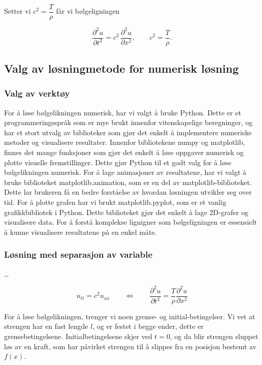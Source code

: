 Setter vi \(c^2=\dfrac{T}{\rho}\) får vi bølgeligningen

\begin{equation}
  \frac{\partial^2 u}{\partial t^2}
  = c^2\,\frac{\partial^2 u}{\partial x^2},
  \qquad
  c^2=\frac{T}{\rho}.
  \label{eq:utledetBolgelikning}
\end{equation}

\subsection{Valg av løsningmetode for numerisk løsning}
\subsubsection{Valg av verktøy}
For å løse bølgelikningen numerisk, har vi valgt å bruke Python. Dette er et programmeringsspråk som er mye brukt innenfor vitenskapelige
beregninger, og har et stort utvalg av biblioteker som gjør det enkelt å implementere numeriske metoder og visualisere resultater. Innenfor 
bibliotekene numpy og matplotlib, finnes det mange funksjoner som gjør det enkelt å løse oppgaver numerisk og plotte visuelle fremstillinger.
Dette gjør Python til et godt valg for å løse bølgelikningen numerisk. For å lage animasjoner av resultatene, har vi valgt å bruke biblioteket 
matplotlib.animation, som er en del av matplotlib-biblioteket. Dette lar brukeren få en bedre forståelse av hvordan løsningen utvikler seg over tid.
For å plotte grafen har vi brukt matplotlib.pyplot, som er et vanlig grafikkbibliotek i Python. Dette biblioteket gjør det enkelt å lage 2D-grafer og 
visualisere data. For å forstå komplekse lignigner som bølgeligningen er essensielt å kunne visualisere resultatene på en enkel måte.

\subsubsection{Løsning med separasjon av variable}
\dots

\begin{equation}
	u_{tt} = c^2 u_{xx} \qquad \iff \qquad 
	\frac{\partial^2 u}{\partial t^2} = \frac{T}{\rho} \frac{\partial^2 u}{\partial x^2}	
	\label{eq:bølgelikningForLøsning}
\end{equation}

For å løse bølgelikningen, trenger vi noen grense- og initial-betingelser. Vi vet at strengen har en fast lengde $l$,
og er festet i begge ender, dette er grensebetingelsene. Initialbetingelsene skjer ved $t=0$, og da blir strengen
sluppet løs av en kraft, som har påvirket strengen til å slippes fra en posisjon bestemt av $f(x)$.

